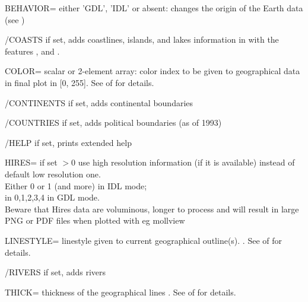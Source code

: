 \begin{keywords}
  \begin{kwlist}{} %
 \item[BEHAVIOR=]  either 'GDL', 'IDL' or absent: 
            changes the origin of the Earth data 
  (see )

 \item[/COASTS]  if set, adds coastlines, islands, and lakes information in  with the features 
,
 and
.

 \item[COLOR=]  scalar or 2-element array: color index to be given to geographical data in final plot in [0, 255]. See  of  for details.

 \item[/CONTINENTS]  if set, adds continental boundaries

 \item[/COUNTRIES]  if set, adds political boundaries (as of 1993)

 \item[/HELP]       if set, prints extended help

 \item[HIRES=] 
	if set $>0$ use high resolution information (if it is available) 
              instead of default low resolution one.\\
              Either 0 or 1 (and more) in IDL mode;\\
              in {0,1,2,3,4} in GDL mode.\\
             Beware that Hires data are voluminous, longer to process
              and will result in large PNG or PDF files when plotted with eg mollview

 \item[LINESTYLE=]  linestyle given to current geographical outline(s). . See  of  for details.

 \item[/RIVERS]  if set, adds rivers

 \item[THICK=]  thickness of the geographical lines .
See  of  for details.

  \end{kwlist}
\end{keywords}  

